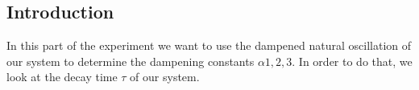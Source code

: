 \subsection{Introduction}
In this part of the experiment we want to use the dampened natural oscillation of our system to determine the dampening constants $\alpha{1, 2, 3}$.
In order to do that, we look at the decay time $\tau$ of our system.

